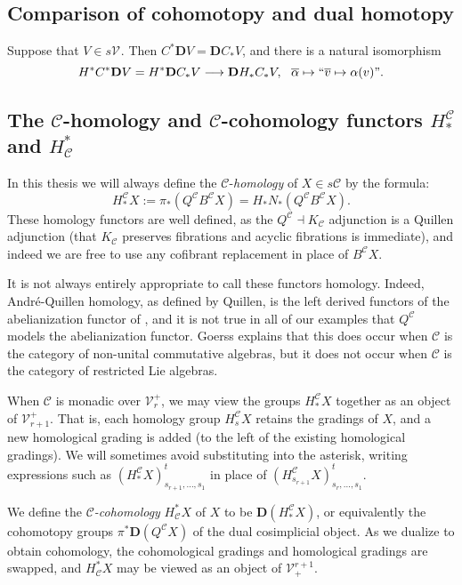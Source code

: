 \documentclass[11pt]{amsart}
\theoremstyle{plain}
\theoremstyle{definition}
\renewcommand{\to}{\longrightarrow}
\newcommand{\calC}{\mathcal{C}}
\newcommand{\calV}{\mathcal{V}}
\newcommand{\calc}{\mathcal{C}}
\theoremstyle{plain}
\newcommand{\vect}[2]{\calV^{#1}_{#2}}
\newcommand{\F}{\mathbb{F}}
\newcommand{\dual}{\mathbf{D}}
\begin{document}
\begin{Conventions and notation}
\subsection{Comparison of cohomotopy and dual homotopy}
Suppose that $V\in s\vect{}{}$. Then $C^*\dual V=\dual C_*V$, and there is a natural isomorphism
\[H^*C^*\dual V=H^*\dual C_*V\to\dual H_* C_*V,\ \ \overline{\alpha}\mapsto\textup{``$\overline{v}\mapsto\alpha(v)$''}.\]

\subsection{The $\calC$-homology and $\calC$-cohomology functors $H^{\calC}_*$ and $H_{\calC}^*$}



In this thesis we will always define the $\calC$-\emph{homology} of $X\in s\calC$ by the formula:
\[H_*^{\calC}X:=\pi_*(Q^\calC B^\calC X)=H_*N_*(Q^\calC B^\calC X).\]
These homology functors are well defined, as the $Q^\calC\dashv K_\calC$ adjunction is a Quillen adjunction (that $K_\calC$ preserves fibrations and acyclic fibrations is immediate), and indeed we are free to use any cofibrant replacement in place of $B^\calC X$.

It is not always entirely appropriate to call these functors homology. Indeed, Andr\'e-Quillen homology, as defined by Quillen, is the left derived functors of the abelianization functor of \cite[\S II.5]{QuillenHomAlg.pdf}, and it is not true in all of our examples that $Q^\calC$ models the abelianization functor. Goerss \cite[\S4]{MR1089001} explains that this does occur when $\calC$ is the category of non-unital commutative algebras, but it does not occur when $\calc$ is the category of restricted Lie algebras.

When $\calC$ is monadic over $\vect{+}{r}$, we may view the groups $H_*^{\calC}X$ together as an object of $\vect{+}{r+1}$. That is, each homology group $H_s^\calC X$ retains the gradings of $X$, and a new homological grading is added (to the left of the existing homological gradings). We will sometimes avoid substituting into the asterisk, writing expressions such as $(H_*^\calC X)_{s_{r+1},\ldots,s_1}^t$ in place of $(H_{s_{r+1}}^\calC X)_{s_r,\ldots,s_1}^t$.

We define the \emph{$\calC$-cohomology} $H^*_\calC X$ of $X$ to be $\dual(H_*^\calC X)$, or equivalently the cohomotopy groups $\pi^*\dual(Q^\calC X)$ of the dual cosimplicial object.  As we dualize to obtain cohomology, the cohomological gradings and homological gradings are swapped, and $H^*_{\calC}X$ may be viewed as an object of $\vect{r+1}{+}$. 



\end{Conventions and notation}
\end{document}
